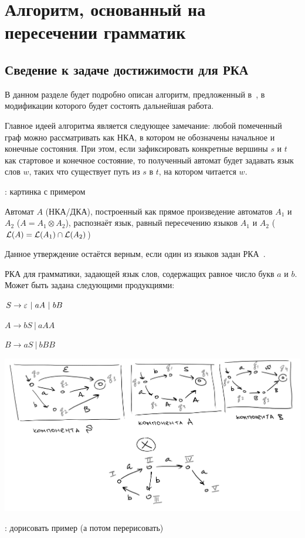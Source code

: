 \section{Алгоритм, основанный на пересечении грамматик}

\subsection{Сведение к задаче достижимости для РКА}

    В данном разделе будет подробно описан алгоритм, предложенный в~\cite{Orachev20}, в модификации которого будет состоять дальнейшая работа.

    Главное идеей алгоритма является следующее замечание: любой помеченный граф можно рассматривать как НКА, в котором не обозначены начальное и конечные состояния. При этом, если зафиксировать конкретные вершины $s$ и $t$ как стартовое и конечное состояние, то полученный автомат будет задавать язык слов $w$, таких что существует путь из $s$ в $t$, на котором читается $w$. 

    \TODO: картинка с примером

    \begin{proposition} \cite{Hopcroft1979}

    Автомат $A$ (НКА/ДКА), построенный как прямое произведение автоматов $A_1$ и $A_2$ ($A = A_1 \otimes A_2$), распознаёт язык, равный пересечению языков $A_1$ и $A_2$ ($\mathcal{L}(A) = \mathcal{L}(A_1) \cap \mathcal{L}(A_2)$)

    \end{proposition}

    Данное утверждение остаётся верным, если один из языков задан РКА~\cite{Beigel}.

    \begin{example}
        РКА для грамматики, задающей язык слов, содержащих равное число букв $a$ и $b$. Может быть задана следующими продукциями:

        $S \rightarrow \varepsilon~|~aA~|~bB$

        $A \to bS~|~aAA$
        
        $B \to aS~|~bBB$

        \includegraphics[width=1\linewidth]{img/example_intersection1}

        \TODO: дорисовать пример (а потом перерисовать)

    \end{example}

